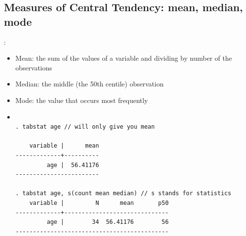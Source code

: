 \subsection{Measures of Central Tendency: mean, median, mode}
\begin{frame}[fragile]{{\secname: \subsecname}}	
\begin{itemize}
	\item Mean: the sum of the values of a variable and dividing
by number of the observations
	\item Median: the middle (the 50th centile) observation
	\item Mode: the value that occurs most frequently
	\item []
\small
\begin{verbatim}

. tabstat age // will only give you mean

    variable |      mean
-------------+----------
         age |  56.41176
------------------------

. tabstat age, s(count mean median) // s stands for statistics
    variable |         N      mean       p50
-------------+------------------------------
         age |        34  56.41176        56
--------------------------------------------
	
\end{verbatim}

\end{itemize}
\end{frame}


